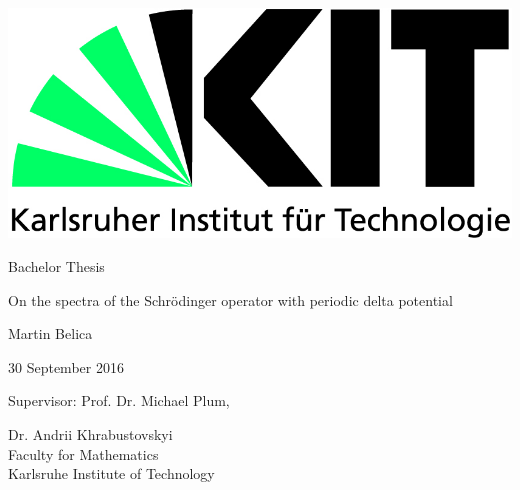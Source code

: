 \begin{titlepage}
  \includegraphics[scale=0.45]{kit-logo.jpg}
  \vspace*{2cm} 

  \begin{center} \large 
    
    Bachelor Thesis
    \vspace*{2cm}

    {\huge On the spectra of the Schrödinger operator with periodic delta potential}
    \vspace*{2.5cm}

    Martin Belica
    \vspace*{0.125cm}

    30 September 2016
    \vspace*{4.25cm}


    Supervisor: Prof. Dr. Michael Plum,
    \vspace*{0.125cm}
    
    Dr. Andrii Khrabustovskyi \\[1cm]
    Faculty for Mathematics \\[1cm]
	Karlsruhe Institute of Technology
  \end{center}
\end{titlepage}